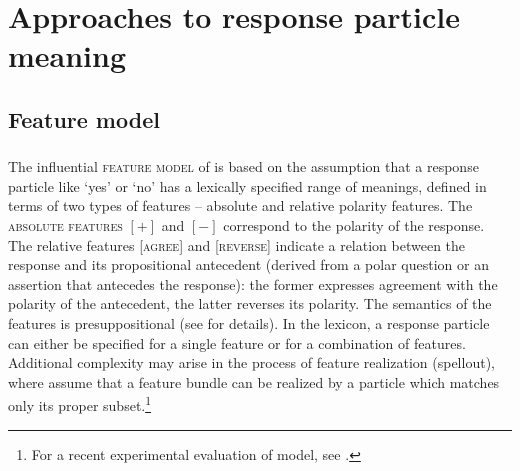 \documentclass[output=paper,colorlinks,citecolor=brown]{langscibook}
\begin{document}
\section{Approaches to response particle meaning}\label{hrdsim:sec:approaches}



\subsection{Feature model} \label{hrdsim:sec:featuresmodel}

\subsubsection{\citet{roelofsen-farkas15}}

The influential \textsc{feature model} of \citet{roelofsen-farkas15} is based on the assumption that a response particle like `yes' or `no' has a lexically specified range of meanings, defined in terms of two types of features -- absolute and relative polarity features. The \textsc{absolute features} $[+]$ and $[-]$ correspond to the polarity of the response. The relative features [\textsc{agree}] and [\textsc{reverse}] indicate a relation between the response and its propositional antecedent (derived from a polar question or an assertion that antecedes the response): the former expresses agreement with the polarity of the antecedent, the latter reverses its polarity. The semantics of the features is presuppositional (see \citealt[385f.]{roelofsen-farkas15} for details). In the lexicon, a response particle can either be specified for a single feature or for a combination of features. Additional complexity may arise in the process of feature realization (spellout), where \citet{roelofsen-farkas15} assume that a feature bundle can be realized by a particle which matches only its proper subset.\footnote{For a recent experimental evaluation of  model, see \citet{Maldonado.Culbertson2023}.}
\end{document}

